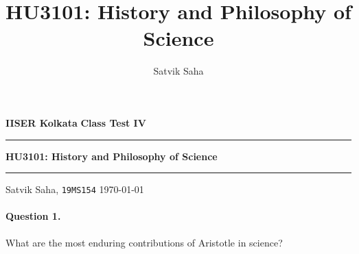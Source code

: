 \documentclass[11pt]{article}
\title{HU3101: History and Philosophy of Science}
\author{Satvik Saha}
\date{}
\theoremstyle{remark}
\begin{document}
    \noindent\textbf{IISER Kolkata} \hfill \textbf{Class Test IV}
    \vspace{3pt}
    \hrule
    \vspace{3pt}
    \begin{center}
    \LARGE{\textbf{HU3101: History and Philosophy of Science}}
    \end{center}
    \vspace{3pt}
    \hrule
    \vspace{3pt}
    Satvik Saha, \texttt{19MS154} \hfill \today
    \vspace{20pt}


    \paragraph{Question 1.} What are the most enduring contributions of Aristotle in
    science?
\end{document}
